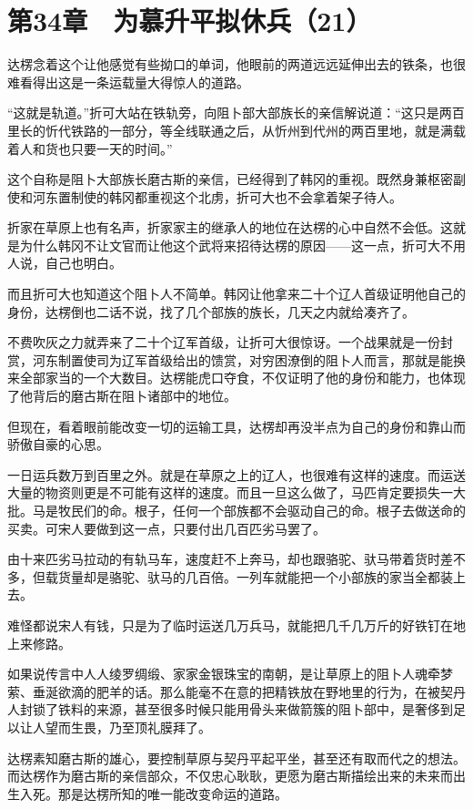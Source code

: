\section{第34章　为慕升平拟休兵（21）}

达楞念着这个让他感觉有些拗口的单词，他眼前的两道远远延伸出去的铁条，也很难看得出这是一条运载量大得惊人的道路。

“这就是轨道。”折可大站在铁轨旁，向阻卜部大部族长的亲信解说道：“这只是两百里长的忻代铁路的一部分，等全线联通之后，从忻州到代州的两百里地，就是满载着人和货也只要一天的时间。”

这个自称是阻卜大部族长磨古斯的亲信，已经得到了韩冈的重视。既然身兼枢密副使和河东置制使的韩冈都重视这个北虏，折可大也不会拿着架子待人。

折家在草原上也有名声，折家家主的继承人的地位在达楞的心中自然不会低。这就是为什么韩冈不让文官而让他这个武将来招待达楞的原因——这一点，折可大不用人说，自己也明白。

而且折可大也知道这个阻卜人不简单。韩冈让他拿来二十个辽人首级证明他自己的身份，达楞倒也二话不说，找了几个部族的族长，几天之内就给凑齐了。

不费吹灰之力就弄来了二十个辽军首级，让折可大很惊讶。一个战果就是一份封赏，河东制置使司为辽军首级给出的馈赏，对穷困潦倒的阻卜人而言，那就是能换来全部家当的一个大数目。达楞能虎口夺食，不仅证明了他的身份和能力，也体现了他背后的磨古斯在阻卜诸部中的地位。

但现在，看着眼前能改变一切的运输工具，达楞却再没半点为自己的身份和靠山而骄傲自豪的心思。

一日运兵数万到百里之外。就是在草原之上的辽人，也很难有这样的速度。而运送大量的物资则更是不可能有这样的速度。而且一旦这么做了，马匹肯定要损失一大批。马是牧民们的命。根子，任何一个部族都不会驱动自己的命。根子去做送命的买卖。可宋人要做到这一点，只要付出几百匹劣马罢了。

由十来匹劣马拉动的有轨马车，速度赶不上奔马，却也跟骆驼、驮马带着货时差不多，但载货量却是骆驼、驮马的几百倍。一列车就能把一个小部族的家当全都装上去。

难怪都说宋人有钱，只是为了临时运送几万兵马，就能把几千几万斤的好铁钉在地上来修路。

如果说传言中人人绫罗绸缎、家家金银珠宝的南朝，是让草原上的阻卜人魂牵梦萦、垂涎欲滴的肥羊的话。那么能毫不在意的把精铁放在野地里的行为，在被契丹人封锁了铁料的来源，甚至很多时候只能用骨头来做箭簇的阻卜部中，是奢侈到足以让人望而生畏，乃至顶礼膜拜了。

达楞素知磨古斯的雄心，要控制草原与契丹平起平坐，甚至还有取而代之的想法。而达楞作为磨古斯的亲信部众，不仅忠心耿耿，更愿为磨古斯描绘出来的未来而出生入死。那是达楞所知的唯一能改变命运的道路。

